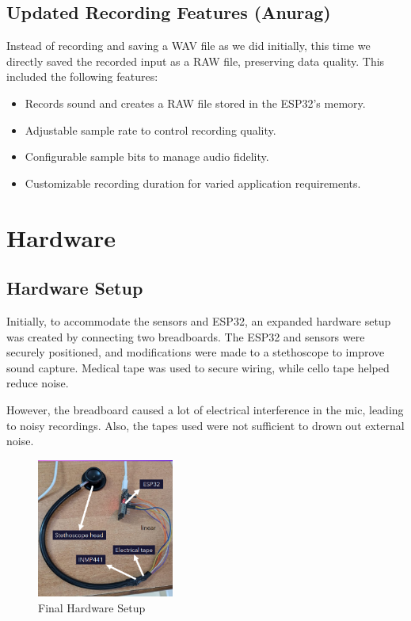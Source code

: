 \documentclass[conference]{IEEEtran}
\begin{document}
\subsection{Updated Recording Features (Anurag)}
Instead of recording and saving a WAV file as we did initially, this time we directly saved the recorded input as a RAW file, preserving data quality. This included the following features:
\begin{itemize}
    \item Records sound and creates a RAW file stored in the ESP32’s memory.
    \item Adjustable sample rate to control recording quality.
    \item Configurable sample bits to manage audio fidelity.
    \item Customizable recording duration for varied application requirements.
\end{itemize}



\section{Hardware}

\subsection{Hardware Setup}
Initially, to accommodate the sensors and ESP32, an expanded hardware setup was created by connecting two breadboards. The ESP32 and sensors were securely positioned, and modifications were made to a stethoscope to improve sound capture. Medical tape was used to secure wiring, while cello tape helped reduce noise.

However, the breadboard caused a lot of electrical interference in the mic, leading to noisy recordings. Also, the tapes used were not sufficient to drown out external noise.

\begin{figure}[h!]
    \centering
    \includegraphics[width=0.4\textwidth]{Images/setup.png}
    \caption{Final Hardware Setup}
\end{figure}
\end{document}
